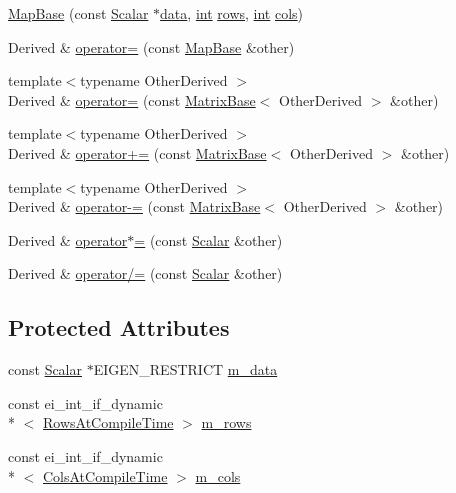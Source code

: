 \begin{DoxyCompactItemize}
\item 
\hyperlink{class_map_base_a590412e78ea2099806d279a105df8121}{Map\-Base} (const \hyperlink{class_map_base_abda8b790105e1c385696bfa2fe7b9c12}{Scalar} $\ast$\hyperlink{glext_8h_a8850df0785e6fbcc2351af3b686b8c7a}{data}, \hyperlink{ioapi_8h_a787fa3cf048117ba7123753c1e74fcd6}{int} \hyperlink{class_map_base_a713737119f010a3baeb38637d3decd89}{rows}, \hyperlink{ioapi_8h_a787fa3cf048117ba7123753c1e74fcd6}{int} \hyperlink{class_map_base_a8d2dbc29d8c3656e4c3a5794803adbe5}{cols})
\item 
Derived \& \hyperlink{class_map_base_a50cd773bb7e0e7fd6b877ba5b08cd132}{operator=} (const \hyperlink{class_map_base}{Map\-Base} \&other)
\item 
{\footnotesize template$<$typename Other\-Derived $>$ }\\Derived \& \hyperlink{class_map_base_a8166037dd3939dac845a835335b50295}{operator=} (const \hyperlink{class_matrix_base}{Matrix\-Base}$<$ Other\-Derived $>$ \&other)
\item 
{\footnotesize template$<$typename Other\-Derived $>$ }\\Derived \& \hyperlink{class_map_base_af570b5ee5150947316c36dfc44d818e3}{operator+=} (const \hyperlink{class_matrix_base}{Matrix\-Base}$<$ Other\-Derived $>$ \&other)
\item 
{\footnotesize template$<$typename Other\-Derived $>$ }\\Derived \& \hyperlink{class_map_base_a7417f73d5c21873216280d1b31599e20}{operator-\/=} (const \hyperlink{class_matrix_base}{Matrix\-Base}$<$ Other\-Derived $>$ \&other)
\item 
Derived \& \hyperlink{class_map_base_ae31ef9d5ce56febf28fb96ba5b952fa2}{operator$\ast$=} (const \hyperlink{class_map_base_abda8b790105e1c385696bfa2fe7b9c12}{Scalar} \&other)
\item 
Derived \& \hyperlink{class_map_base_a8240ea7bdc89fc8721b2e03fe8e74ed4}{operator/=} (const \hyperlink{class_map_base_abda8b790105e1c385696bfa2fe7b9c12}{Scalar} \&other)
\end{DoxyCompactItemize}
\subsection*{Protected Attributes}
\begin{DoxyCompactItemize}
\item 
const \hyperlink{class_map_base_abda8b790105e1c385696bfa2fe7b9c12}{Scalar} $\ast$E\-I\-G\-E\-N\-\_\-\-R\-E\-S\-T\-R\-I\-C\-T \hyperlink{class_map_base_a830f607dc613fa3dc3547f0db67e59c8}{m\-\_\-data}
\item 
const ei\-\_\-int\-\_\-if\-\_\-dynamic\\*
$<$ \hyperlink{class_map_base_ac719f876d6f36041268461062909ba94a4f9a290363768bcc82976c99dbcb7e46}{Rows\-At\-Compile\-Time} $>$ \hyperlink{class_map_base_a9c146d4de664cdd69bfa8f464ea82ef1}{m\-\_\-rows}
\item 
const ei\-\_\-int\-\_\-if\-\_\-dynamic\\*
$<$ \hyperlink{class_map_base_ac719f876d6f36041268461062909ba94ad4c60fe2e96f171c54fee1204b86d2d3}{Cols\-At\-Compile\-Time} $>$ \hyperlink{class_map_base_a4e326bce32c4db9d798c1313aacd0372}{m\-\_\-cols}
\end{DoxyCompactItemize}
